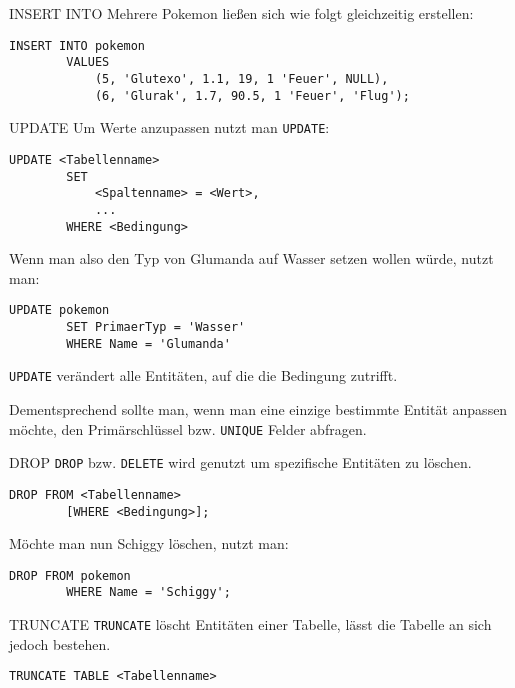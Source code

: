 \begin{example}{INSERT INTO}
    Mehrere Pokemon ließen sich wie folgt gleichzeitig erstellen:

    \begin{lstlisting}[language=mysql]
        INSERT INTO pokemon
        VALUES
            (5, 'Glutexo', 1.1, 19, 1 'Feuer', NULL),
            (6, 'Glurak', 1.7, 90.5, 1 'Feuer', 'Flug');
    \end{lstlisting}
\end{example}

\begin{sql}{UPDATE}
    Um Werte anzupassen nutzt man \texttt{UPDATE}:

    \begin{lstlisting}[language=mysql]
        UPDATE <Tabellenname>
        SET
            <Spaltenname> = <Wert>,
            ...
        WHERE <Bedingung>
    \end{lstlisting}

    Wenn man also den Typ von Glumanda auf Wasser setzen wollen würde, nutzt man:

    \begin{lstlisting}[language=mysql]
        UPDATE pokemon
        SET PrimaerTyp = 'Wasser'
        WHERE Name = 'Glumanda'
    \end{lstlisting}

    \texttt{UPDATE} verändert alle Entitäten, auf die die Bedingung zutrifft.
    
    Dementsprechend sollte man, wenn man eine einzige bestimmte Entität anpassen möchte, den Primärschlüssel bzw. \texttt{UNIQUE} Felder abfragen.
\end{sql}

\begin{sql}{DROP}
    \texttt{DROP} bzw. \texttt{DELETE} wird genutzt um spezifische Entitäten zu löschen.

    \begin{lstlisting}[language=mysql]
        DROP FROM <Tabellenname>
        [WHERE <Bedingung>];
    \end{lstlisting}

    Möchte man nun Schiggy löschen, nutzt man:

    \begin{lstlisting}[language=mysql]
        DROP FROM pokemon
        WHERE Name = 'Schiggy';
    \end{lstlisting}
\end{sql}

\begin{sql}{TRUNCATE}
    \texttt{TRUNCATE} löscht Entitäten einer Tabelle, lässt die Tabelle an sich jedoch bestehen.

    \begin{lstlisting}[language=mysql]
        TRUNCATE TABLE <Tabellenname>        
    \end{lstlisting}
\end{sql}

